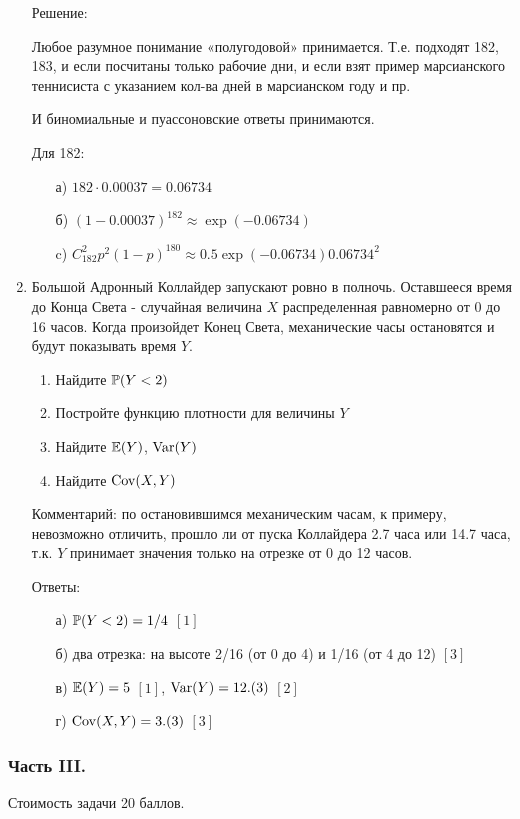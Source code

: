 \documentclass[12pt, a4paper]{article}\usepackage[]{graphicx}\usepackage[]{color}
\begin{document}
\begin{enumerate}
Решение:

Любое разумное понимание «полугодовой» принимается. Т.е. подходят 182, 183, и если посчитаны только рабочие дни, и если взят пример марсианского теннисиста с указанием кол-ва дней в марсианском году и пр.

И биномиальные и пуассоновские ответы принимаются.

Для 182:
\begin{enumerate}
\item[а)] $182\cdot 0.00037=0.06734$
\item[б)] $(1-0.00037)^182\approx \exp(-0.06734)$
\item[c)] $C_{182}^{2}p^{2}(1-p)^{180}\approx 0.5\exp(-0.06734)0.06734^2$
\end{enumerate}

\item Большой Адронный Коллайдер запускают ровно в полночь. Оставшееся время до Конца Света - случайная величина $X$ распределенная равномерно от 0 до 16 часов. Когда произойдет Конец Света, механические часы остановятся и будут показывать время $Y$.
\begin{enumerate}
\item Найдите $\P(Y<2)$
\item Постройте функцию плотности для величины $Y$
\item Найдите $\E(Y)$, $\Var(Y)$
\item Найдите $\Cov(X,Y)$
\end{enumerate}
Комментарий: по остановившимся механическим часам, к примеру, невозможно отличить, прошло ли от пуска Коллайдера 2.7 часа или 14.7 часа, т.к. $Y$ принимает значения только на отрезке от 0 до 12 часов.

Ответы:
\begin{enumerate}
\item[а)] $\P(Y<2)=1/4$ $[1]$
\item[б)] два отрезка: на высоте 2/16 (от 0 до 4) и 1/16 (от 4 до 12) $[3]$
\item[в)] $\E(Y)=5$ $[1]$, $\Var(Y)=12.(3)$ $[2]$
\item[г)] $\Cov(X,Y)=3.(3)$ $[3]$
\end{enumerate}
\end{enumerate}

\subsubsection*{Часть III.}

Стоимость задачи 20 баллов.
\end{document}

